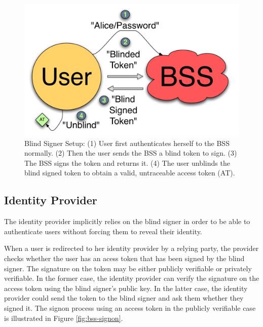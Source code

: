 \documentclass{llncs}
\begin{document}
\begin{figure}
  \centering
  \includegraphics[scale=0.6]{figs/fig-bss-setup-color.pdf}
  \caption{Blind Signer Setup: (1) User first authenticates herself to the BSS
  normally. (2) Then the user sends the BSS a blind token to sign. (3) The BSS
  signs the token and returns it. (4) The user unblinds the blind signed token
  to obtain a valid, untraceable access token (AT).}
  \label{fig:bss-setup}
\end{figure}

\subsection{Identity Provider}

The identity provider implicitly relies on the blind signer in order to be able
to authenticate users without forcing them to reveal their identity.

When a user is redirected to her identity provider by a relying party, the
provider checks whether the user has an acess token that has been signed by the
blind signer. The signature on the token may be either publicly verifiable or
privately verifiable. In the former case, the identity provider can verify the
signature on the access token using the blind signer's public key. In the latter
case, the identity provider could send the token to the blind signer and ask
them whether they signed it. The signon process using an access token in the
publicly verifiable case is illustrated in Figure \ref{fig:bss-signon}.
\end{document}
